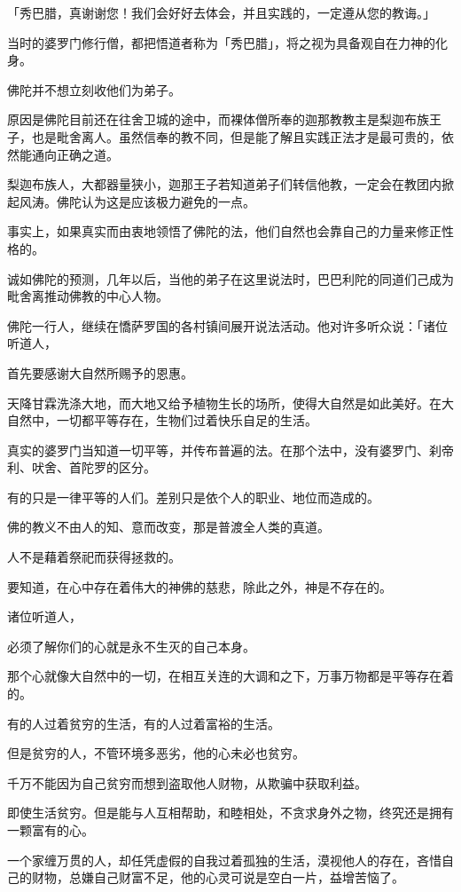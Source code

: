 \documentclass[twoside,openany]{book}
\begin{document}
「秀巴腊，真谢谢您！我们会好好去体会，并且实践的，一定遵从您的教诲。」

当时的婆罗门修行僧，都把悟道者称为「秀巴腊」，将之视为具备观自在力神的化身。

佛陀并不想立刻收他们为弟子。

原因是佛陀目前还在往舍卫城的途中，而裸体僧所奉的迦那教教主是梨迦布族王子，也是毗舍离人。虽然信奉的教不同，但是能了解且实践正法才是最可贵的，依然能通向正确之道。

梨迦布族人，大都器量狭小，迦那王子若知道弟子们转信他教，一定会在教团内掀起风涛。佛陀认为这是应该极力避免的一点。

事实上，如果真实而由衷地领悟了佛陀的法，他们自然也会靠自己的力量来修正性格的。

诚如佛陀的预测，几年以后，当他的弟子在这里说法时，巴巴利陀的同道们己成为毗舍离推动佛教的中心人物。

佛陀一行人，继续在憍萨罗国的各村镇间展开说法活动。他对许多听众说：「诸位听道人，

首先要感谢大自然所赐予的恩惠。

天降甘霖洗涤大地，而大地又给予植物生长的场所，使得大自然是如此美好。在大自然中，一切都平等存在，生物们过着快乐自足的生活。

真实的婆罗门当知道一切平等，并传布普遍的法。在那个法中，没有婆罗门、刹帝利、吠舍、首陀罗的区分。

有的只是一律平等的人们。差别只是依个人的职业、地位而造成的。

佛的教义不由人的知、意而改变，那是普渡全人类的真道。

人不是藉着祭祀而获得拯救的。

要知道，在心中存在着伟大的神佛的慈悲，除此之外，神是不存在的。

诸位听道人，

必须了解你们的心就是永不生灭的自己本身。

那个心就像大自然中的一切，在相互关连的大调和之下，万事万物都是平等存在着的。

有的人过着贫穷的生活，有的人过着富裕的生活。

但是贫穷的人，不管环境多恶劣，他的心未必也贫穷。

千万不能因为自己贫穷而想到盗取他人财物，从欺骗中获取利益。

即使生活贫穷。但是能与人互相帮助，和睦相处，不贪求身外之物，终究还是拥有一颗富有的心。

一个家缠万贯的人，却任凭虚假的自我过着孤独的生活，漠视他人的存在，吝惜自己的财物，总嫌自己财富不足，他的心灵可说是空白一片，益增苦恼了。
\end{document}
